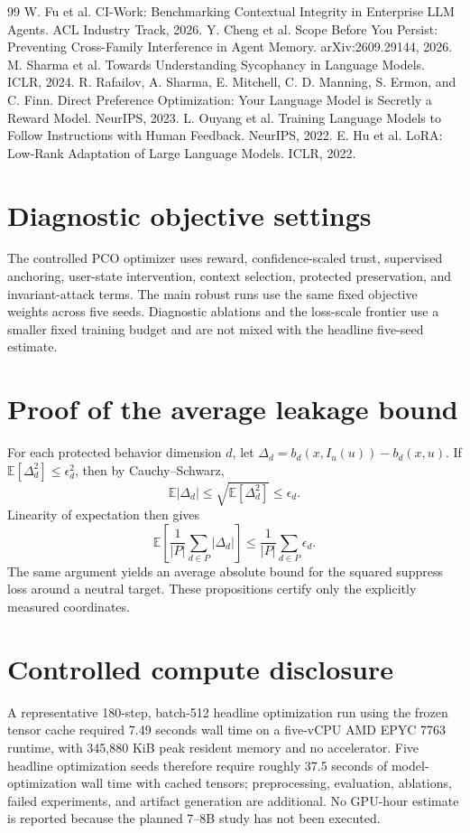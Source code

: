 \begin{thebibliography}{99}
 W. Fu et al. CI-Work: Benchmarking Contextual Integrity in Enterprise LLM Agents. ACL Industry Track, 2026.
 Y. Cheng et al. Scope Before You Persist: Preventing Cross-Family Interference in Agent Memory. arXiv:2609.29144, 2026.
 M. Sharma et al. Towards Understanding Sycophancy in Language Models. ICLR, 2024.
 R. Rafailov, A. Sharma, E. Mitchell, C. D. Manning, S. Ermon, and C. Finn. Direct Preference Optimization: Your Language Model is Secretly a Reward Model. NeurIPS, 2023.
 L. Ouyang et al. Training Language Models to Follow Instructions with Human Feedback. NeurIPS, 2022.
 E. Hu et al. LoRA: Low-Rank Adaptation of Large Language Models. ICLR, 2022.
\end{thebibliography}

\appendix
\section{Diagnostic objective settings}
The controlled PCO optimizer uses reward, confidence-scaled trust, supervised anchoring, user-state intervention, context selection, protected preservation, and invariant-attack terms. The main robust runs use the same fixed objective weights across five seeds. Diagnostic ablations and the loss-scale frontier use a smaller fixed training budget and are not mixed with the headline five-seed estimate.

\section{Proof of the average leakage bound}
For each protected behavior dimension $d$, let $\Delta_d=b_d(x,I_u(u))-b_d(x,u)$. If $\mathbb{E}[\Delta_d^2]\le\epsilon_d^2$, then by Cauchy--Schwarz,
\begin{equation}
\mathbb{E}|\Delta_d| \le \sqrt{\mathbb{E}[\Delta_d^2]} \le \epsilon_d.
\end{equation}
Linearity of expectation then gives
\begin{equation}
\mathbb{E}\left[\frac{1}{|P|}\sum_{d\in P}|\Delta_d|\right]
\le \frac{1}{|P|}\sum_{d\in P}\epsilon_d.
\end{equation}
The same argument yields an average absolute bound for the squared suppress loss around a neutral target. These propositions certify only the explicitly measured coordinates.

\section{Controlled compute disclosure}
A representative 180-step, batch-512 headline optimization run using the frozen tensor cache required 7.49 seconds wall time on a five-vCPU AMD EPYC 7763 runtime, with 345,880 KiB peak resident memory and no accelerator. Five headline optimization seeds therefore require roughly 37.5 seconds of model-optimization wall time with cached tensors; preprocessing, evaluation, ablations, failed experiments, and artifact generation are additional. No GPU-hour estimate is reported because the planned 7--8B study has not been executed.
